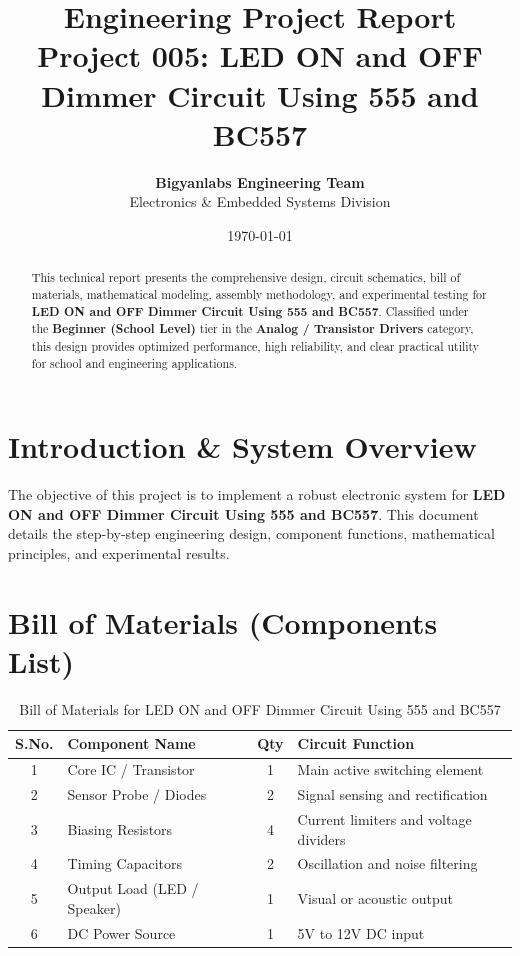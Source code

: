 \documentclass[11pt,a4paper]{article}
\title{\textbf{\Huge Engineering Project Report}\\[0.5em] \Large Project 005: LED ON and OFF Dimmer Circuit Using 555 and BC557}
\author{\textbf{Bigyanlabs Engineering Team}\\ Electronics \& Embedded Systems Division}
\date{\today}
\begin{document}
\maketitle
\thispagestyle{empty}

\begin{abstract}
This technical report presents the comprehensive design, circuit schematics, bill of materials, mathematical modeling, assembly methodology, and experimental testing for \textbf{LED ON and OFF Dimmer Circuit Using 555 and BC557}. Classified under the \textbf{Beginner (School Level)} tier in the \textbf{Analog / Transistor Drivers} category, this design provides optimized performance, high reliability, and clear practical utility for school and engineering applications.
\end{abstract}

\newpage
\tableofcontents
\newpage

\section{Introduction \& System Overview}
The objective of this project is to implement a robust electronic system for \textbf{LED ON and OFF Dimmer Circuit Using 555 and BC557}. This document details the step-by-step engineering design, component functions, mathematical principles, and experimental results.

\section{Bill of Materials (Components List)}
\begin{table}[h!]
\centering
\caption{Bill of Materials for LED ON and OFF Dimmer Circuit Using 555 and BC557}
\vspace{0.5em}
\begin{tabular}{clcp{7cm}}
\toprule
\textbf{S.No.} & \textbf{Component Name} & \textbf{Qty} & \textbf{Circuit Function} \\
\midrule
1 & Core IC / Transistor & 1 & Main active switching element \\
2 & Sensor Probe / Diodes & 2 & Signal sensing and rectification \\
3 & Biasing Resistors & 4 & Current limiters and voltage dividers \\
4 & Timing Capacitors & 2 & Oscillation and noise filtering \\
5 & Output Load (LED / Speaker) & 1 & Visual or acoustic output \\
6 & DC Power Source & 1 & 5V to 12V DC input \\
\bottomrule
\end{tabular}
\end{table}
\end{document}
